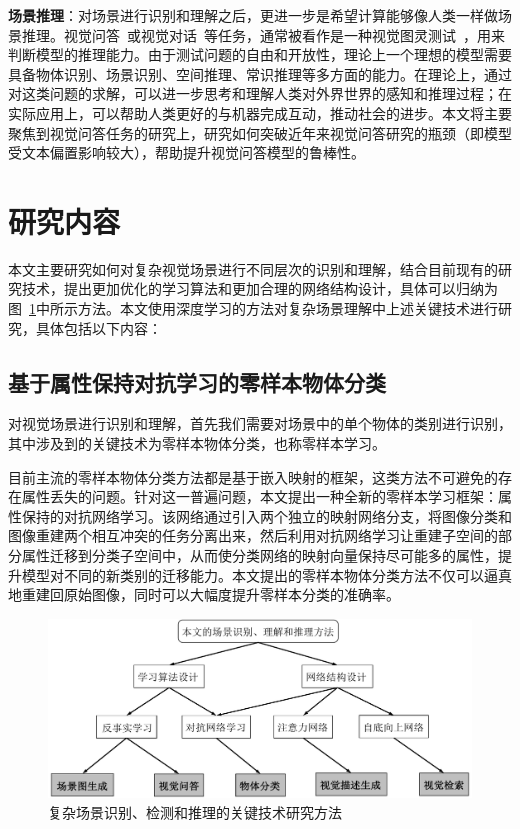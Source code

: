 \begin{asparaenum}
\item \textbf{场景推理}：对场景进行识别和理解之后，更进一步是希望计算能够像人类一样做场景推理。视觉问答~\cite{antol2015vqa}或视觉对话~\cite{das2017visual}等任务，通常被看作是一种视觉图灵测试~\cite{malinowski2014towards,geman2015visual}，用来判断模型的推理能力。由于测试问题的自由和开放性，理论上一个理想的模型需要具备物体识别、场景识别、空间推理、常识推理等多方面的能力。在理论上，通过对这类问题的求解，可以进一步思考和理解人类对外界世界的感知和推理过程；在实际应用上，可以帮助人类更好的与机器完成互动，推动社会的进步。本文将主要聚焦到视觉问答任务的研究上，研究如何突破近年来视觉问答研究的瓶颈（即模型受文本偏置影响较大），帮助提升视觉问答模型的鲁棒性。
\end{asparaenum}

\section{研究内容}

本文主要研究如何对复杂视觉场景进行不同层次的识别和理解，结合目前现有的研究技术，提出更加优化的学习算法和更加合理的网络结构设计，具体可以归纳为图~\ref{ch1:fig:technique_summary}中所示方法。本文使用深度学习的方法对复杂场景理解中上述关键技术进行研究，具体包括以下内容：

\subsection{基于属性保持对抗学习的零样本物体分类}
对视觉场景进行识别和理解，首先我们需要对场景中的单个物体的类别进行识别，其中涉及到的关键技术为零样本物体分类，也称零样本学习。

目前主流的零样本物体分类方法都是基于嵌入映射的框架，这类方法不可避免的存在属性丢失的问题。针对这一普遍问题，本文提出一种全新的零样本学习框架：属性保持的对抗网络学习。该网络通过引入两个独立的映射网络分支，将图像分类和图像重建两个相互冲突的任务分离出来，然后利用对抗网络学习让重建子空间的部分属性迁移到分类子空间中，从而使分类网络的映射向量保持尽可能多的属性，提升模型对不同的新类别的迁移能力。本文提出的零样本物体分类方法不仅可以逼真地重建回原始图像，同时可以大幅度提升零样本分类的准确率。

\begin{figure}[h]
    \centering
        \includegraphics[width=0.95\linewidth]{chapter1/res/technique_summary.pdf}
    \centering
    \caption{复杂场景识别、检测和推理的关键技术研究方法}
    \label{ch1:fig:technique_summary}
\end{figure}



